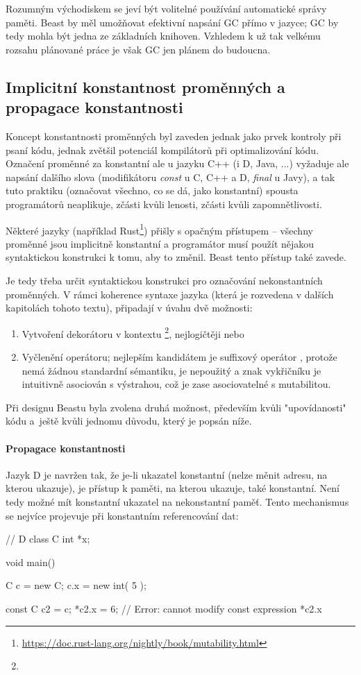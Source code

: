Rozumným východiskem se jeví být volitelné používání automatické správy paměti. Beast by měl umožňovat efektivní napsání GC přímo v jazyce; GC by tedy mohla být jedna ze základních knihoven. Vzhledem k už tak velkému rozsahu plánované práce je však GC jen plánem do budoucna.

\subsection{Implicitní konstantnost proměnných a propagace konstantnosti}
Koncept konstantnosti proměnných byl zaveden jednak jako prvek kontroly při psaní kódu, jednak zvětšil potenciál kompilátorů při optimalizování kódu. Označení proměnné za konstantní ale u jazyku C++ (i D, Java, ...) vyžaduje ale napsání dalšího slova (modifikátoru \textit{const} u C, C++ a D, \textit{final} u Javy), a tak tuto praktiku (označovat všechno, co se dá, jako konstantní) spousta programátorů neaplikuje, zčásti kvůli lenosti, zčásti kvůli zapomnětlivosti.

Některé jazyky (například Rust\footnote{\url{https://doc.rust-lang.org/nightly/book/mutability.html}}) přišly s opačným přístupem -- všechny proměnné jsou implicitně konstantní a programátor musí použít nějakou syntaktickou konstrukci k tomu, aby to změnil. Beast tento přístup také zavede.

Je tedy třeba určit syntaktickou konstrukci pro označování nekonstantních proměnných. V rámci koherence syntaxe jazyka (která je rozvedena v dalších kapitolách tohoto textu), připadají  v úvahu dvě možnosti:
\begin{enumerate}
	\item Vytvoření dekorátoru v kontextu \footnote{}, nejlogičtěji  nebo 
	\item Vyčlenění operátoru; nejlepším kandidátem je suffixový operátor , protože nemá žádnou standardní sémantiku, je nepoužitý a znak vykřičníku je intuitivně asociován s výstrahou, což je zase asociovatelné s mutabilitou.
\end{enumerate}

Při designu Beastu byla zvolena druhá možnost, především kvůli "upovídanosti" kódu a~ještě kvůli jednomu důvodu, který je popsán níže.

\paragraph{Propagace konstantnosti} \label{constPropagation} Jazyk D je navržen tak, že je-li ukazatel konstantní (nelze měnit adresu, na kterou ukazuje), je přístup k paměti, na kterou ukazuje, také konstantní. Není tedy možné mít konstantní ukazatel na nekonstantní paměť. Tento mechanismus se nejvíce projevuje při konstantním referencování dat:
\begin{dcode}
// D
class C {
	int *x;
}

void main() {
	C c = new C;
	c.x = new int( 5 );
	
	const C c2 = c;
	*c2.x = 6; // Error: cannot modify const expression *c2.x
}
\end{dcode}

